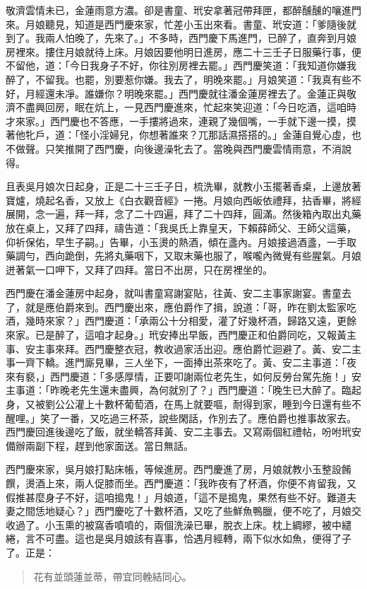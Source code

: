 敬濟雲情未已，金蓮雨意方濃。卻是書童、玳安拿著冠帶拜匣，都醉醺醺的嚷進門來。月娘聽見，知道是西門慶來家，忙差小玉出來看。書童、玳安道：「爹隨後就到了。我兩人怕晚了，先來了。」不多時，西門慶下馬進門，已醉了，直奔到月娘房裡來。摟住月娘就待上床。月娘因要他明日進房，應二十三壬子日服藥行事，便不留他，道：「今日我身子不好，你往別房裡去罷。」西門慶笑道：「我知道你嫌我醉了，不留我。也罷，別要惹你嫌。我去了，明晚來罷。」月娘笑道：「我真有些不好，月經還未凈。誰嫌你？明晚來罷。」西門慶就往潘金蓮房裡去了。金蓮正與敬濟不盡興回房，眠在炕上，一見西門慶進來，忙起來笑迎道：「今日吃酒，這咱時才來家。」西門慶也不答應，一手摟將過來，連親了幾個嘴，一手就下邊一摸，摸著他牝戶，道：「怪小淫婦兒，你想著誰來？兀那話濕搭搭的。」金蓮自覺心虛，也不做聲。只笑推開了西門慶，向後邊澡牝去了。當晚與西門慶雲情雨意，不消說得。

且表吳月娘次日起身，正是二十三壬子日，梳洗畢，就教小玉擺著香桌，上邊放著寶爐，燒起名香，又放上《白衣觀音經》一捲。月娘向西皈依禮拜，拈香畢，將經展開，念一遍，拜一拜，念了二十四遍，拜了二十四拜，圓滿。然後箱內取出丸藥放在桌上，又拜了四拜，禱告道：「我吳氏上靠皇天，下賴薛師父、王師父這藥，仰祈保佑，早生子嗣。」告畢，小玉燙的熱酒，傾在盞內。月娘接過酒盞，一手取藥調勻，西向跪倒，先將丸藥咽下，又取末藥也服了，喉嚨內微覺有些腥氣。月娘迸著氣一口呷下，又拜了四拜。當日不出房，只在房裡坐的。

西門慶在潘金蓮房中起身，就叫書童寫謝宴貼，往黃、安二主事家謝宴。書童去了，就是應伯爵來到。西門慶出來，應伯爵作了揖，說道：「哥，昨在劉太監家吃酒，幾時來家？」西門慶道：「承兩公十分相愛，灌了好幾杯酒，歸路又遠，更餘來家。已是醉了，這咱才起身。」玳安捧出早飯，西門慶正和伯爵同吃，又報黃主事、安主事來拜。西門慶整衣冠，教收過家活出迎。應伯爵忙迴避了。黃、安二主事一齊下轎。進門廝見畢，三人坐下，一面捧出茶來吃了。黃、安二主事道：「夜來有褻，」西門慶道：「多感厚情，正要叩謝兩位老先生，如何反勞台駕先施！」安主事道：「昨晚老先生還未盡興，為何就別了？」西門慶道：「晚生已大醉了。臨起身，又被劉公公灌上十數杯葡萄酒，在馬上就要嘔，耐得到家，睡到今日還有些不醒哩。」笑了一番，又吃過三杯茶，說些閑話，作別去了。應伯爵也推事故家去。西門慶回進後邊吃了飯，就坐轎答拜黃、安二主事去。又寫兩個紅禮帖，吩咐玳安備辦兩副下程，趕到他家面送。當日無話。

西門慶來家，吳月娘打點床帳，等候進房。西門慶進了房，月娘就教小玉整設餚饌，燙酒上來，兩人促膝而坐。西門慶道：「我昨夜有了杯酒，你便不肯留我，又假推甚麼身子不好，這咱搗鬼！」月娘道，「這不是搗鬼，果然有些不好。難道夫妻之間恁地疑心？」西門慶吃了十數杯酒，又吃了些鮮魚鴨臘，便不吃了，月娘交收過了。小玉熏的被窩香噴噴的，兩個洗澡已畢，脫衣上床。枕上綢繆，被中繾綣，言不可盡。這也是吳月娘該有喜事，恰遇月經轉，兩下似水如魚，便得了子了。正是：
\begin{quote}
花有並頭蓮並蒂，帶宜同輓結同心。
\end{quote}

